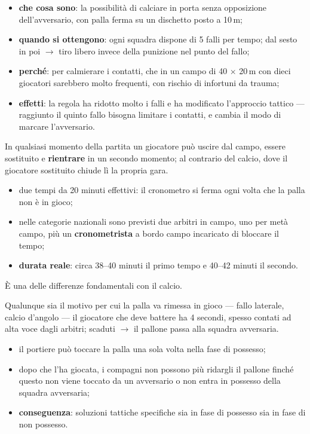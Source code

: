 \begin{itemize}
  \item \textbf{che cosa sono}: la possibilità di calciare in porta senza opposizione
    dell'avversario, con palla ferma su un dischetto posto a 10\,m;
  \item \textbf{quando si ottengono}: ogni squadra dispone di 5 falli per tempo; dal sesto in poi
    $\rightarrow$ tiro libero invece della punizione nel punto del fallo;
  \item \textbf{perché}: per calmierare i contatti, che in un campo di 40 $\times$ 20\,m con dieci
    giocatori sarebbero molto frequenti, con rischio di infortuni da trauma;
  \item \textbf{effetti}: la regola ha ridotto molto i falli e ha modificato l'approccio tattico ---
    raggiunto il quinto fallo bisogna limitare i contatti, e cambia il modo di marcare l'avversario.
\end{itemize}

In qualsiasi momento della partita un giocatore può uscire dal campo, essere sostituito e
\textbf{rientrare} in un secondo momento; al contrario del calcio, dove il giocatore sostituito
chiude lì la propria gara.

\begin{itemize}
  \item due tempi da 20 minuti effettivi: il cronometro si ferma ogni volta che la palla non è in
    gioco;
  \item nelle categorie nazionali sono previsti due arbitri in campo, uno per metà campo, più un
    \textbf{cronometrista} a bordo campo incaricato di bloccare il tempo;
  \item \textbf{durata reale}: circa 38--40 minuti il primo tempo e 40--42 minuti il secondo.
\end{itemize}

È una delle differenze fondamentali con il calcio.

Qualunque sia il motivo per cui la palla va rimessa in gioco --- fallo laterale, calcio d'angolo ---
il giocatore che deve battere ha 4 secondi, spesso contati ad alta voce dagli arbitri; scaduti
$\rightarrow$ il pallone passa alla squadra avversaria.

\begin{itemize}
  \item il portiere può toccare la palla una sola volta nella fase di possesso;
  \item dopo che l'ha giocata, i compagni non possono più ridargli il pallone finché questo non
    viene toccato da un avversario o non entra in possesso della squadra avversaria;
  \item \textbf{conseguenza}: soluzioni tattiche specifiche sia in fase di possesso sia in fase di
    non possesso.
\end{itemize}

